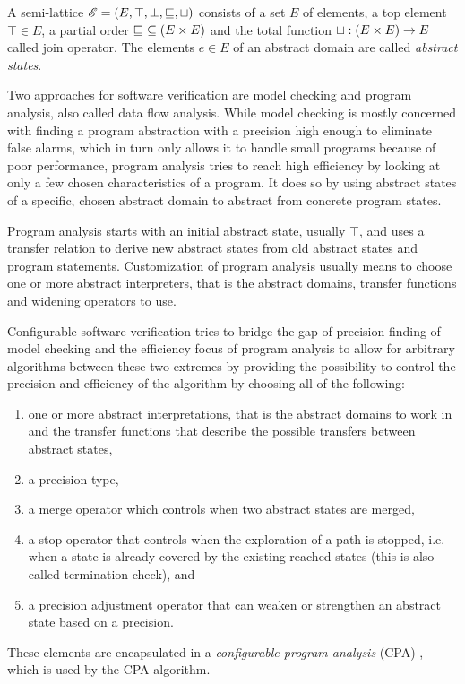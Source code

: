A semi-lattice $\mathscr{E} = (E, \top, \bot, \sqsubseteq, \sqcup)$ consists of a set $E$ of elements, a top element $\top \in E$, a partial order $\sqsubseteq\ \subseteq (E \times E)$
and the total function $\sqcup : (E \times E) \rightarrow E$ called join operator. The elements $e \in E$ of an abstract domain are called \emph{abstract states}.

Two approaches for software verification are model checking and program analysis, also called data flow analysis.
While model checking is mostly concerned with finding a program abstraction with a precision high enough to eliminate false alarms,
which in turn only allows it to handle small programs because of poor performance,
program analysis tries to reach high efficiency by looking at only a few chosen characteristics of a program. %
It does so by using abstract states of a specific, chosen abstract domain to abstract from concrete program states.

Program analysis starts with an initial abstract state, usually $\top$, and uses a transfer relation to derive new abstract states from old abstract states and program statements.
Customization of program analysis usually means to choose one or more abstract interpreters, that is the abstract domains, transfer functions and widening operators to use.\cite{Beyer2007}

Configurable software verification tries to bridge the gap of precision finding of model checking and the efficiency focus of program analysis to allow for arbitrary algorithms between these two extremes by providing the possibility to control the precision and efficiency of the algorithm by choosing all of the following:
\begin{enumerate}[label=\alph*)]
\item one or more abstract interpretations, that is the abstract domains to work in and the transfer functions that describe the possible transfers between abstract states,
\item a precision type,
\item a merge operator which controls when two abstract states are merged,
\item a stop operator that controls when the exploration of a path is stopped, i.e. when a state is already covered by the existing reached states (this is also called termination check), and
\item a precision adjustment operator that can weaken or strengthen an abstract state based on a precision.
\end{enumerate}
These elements are encapsulated in a \emph{configurable program analysis} (CPA) \cite{Beyer2008}, which is used by the CPA algorithm.

